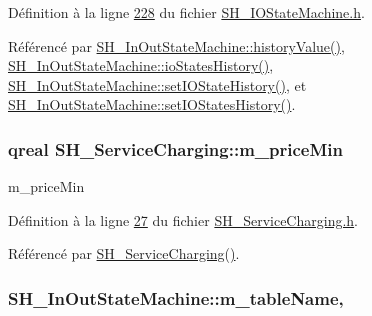 Définition à la ligne \hyperlink{SH__IOStateMachine_8h_source_l00228}{228} du fichier \hyperlink{SH__IOStateMachine_8h_source}{S\-H\-\_\-\-I\-O\-State\-Machine.\-h}.



Référencé par \hyperlink{classSH__InOutStateMachine_af71bfdb3b59b7bf2763588b513b4205f}{S\-H\-\_\-\-In\-Out\-State\-Machine\-::history\-Value()}, \hyperlink{classSH__InOutStateMachine_a13889998c6dcd17db984dd6ed1454e80}{S\-H\-\_\-\-In\-Out\-State\-Machine\-::io\-States\-History()}, \hyperlink{classSH__InOutStateMachine_acbcce2c4300af1634d928b30e5e9be1c}{S\-H\-\_\-\-In\-Out\-State\-Machine\-::set\-I\-O\-State\-History()}, et \hyperlink{classSH__InOutStateMachine_af51f92c37d00a4eec4da42113cfd7d73}{S\-H\-\_\-\-In\-Out\-State\-Machine\-::set\-I\-O\-States\-History()}.

\hypertarget{classSH__ServiceCharging_a44584a7ff1edd6ae03c4f77544136c13}{
\subsubsection[{m\-\_\-price\-Min}]{\setlength{\rightskip}{0pt plus 5cm}qreal S\-H\-\_\-\-Service\-Charging\-::m\-\_\-price\-Min\hspace{0.3cm}{\ttfamily [private]}}}\label{classSH__ServiceCharging_a44584a7ff1edd6ae03c4f77544136c13}


m\-\_\-price\-Min 



Définition à la ligne \hyperlink{SH__ServiceCharging_8h_source_l00027}{27} du fichier \hyperlink{SH__ServiceCharging_8h_source}{S\-H\-\_\-\-Service\-Charging.\-h}.



Référencé par \hyperlink{classSH__ServiceCharging_afa5273d046049b1c2b020a6a19a8290b}{S\-H\-\_\-\-Service\-Charging()}.

\hypertarget{classSH__InOutStateMachine_aa009eecc5ab6181358faafb5996b6006}{
\subsubsection[{m\-\_\-table\-Name}]{\setlength{\rightskip}{0pt plus 5cm}S\-H\-\_\-\-In\-Out\-State\-Machine\-::m\-\_\-table\-Name\hspace{0.3cm}{\ttfamily [protected]}, {\ttfamily [inherited]}}}\label{classSH__InOutStateMachine_aa009eecc5ab6181358faafb5996b6006}


